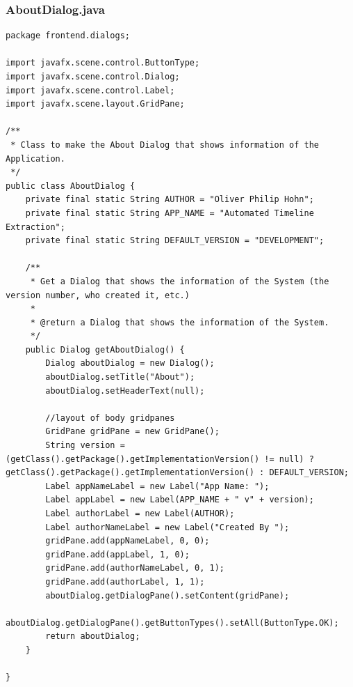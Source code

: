 \subsubsection{AboutDialog.java}
\begin{lstlisting}
package frontend.dialogs;

import javafx.scene.control.ButtonType;
import javafx.scene.control.Dialog;
import javafx.scene.control.Label;
import javafx.scene.layout.GridPane;

/**
 * Class to make the About Dialog that shows information of the Application.
 */
public class AboutDialog {
    private final static String AUTHOR = "Oliver Philip Hohn";
    private final static String APP_NAME = "Automated Timeline Extraction";
    private final static String DEFAULT_VERSION = "DEVELOPMENT";

    /**
     * Get a Dialog that shows the information of the System (the version number, who created it, etc.)
     *
     * @return a Dialog that shows the information of the System.
     */
    public Dialog getAboutDialog() {
        Dialog aboutDialog = new Dialog();
        aboutDialog.setTitle("About");
        aboutDialog.setHeaderText(null);

        //layout of body gridpanes
        GridPane gridPane = new GridPane();
        String version = (getClass().getPackage().getImplementationVersion() != null) ? getClass().getPackage().getImplementationVersion() : DEFAULT_VERSION;
        Label appNameLabel = new Label("App Name: ");
        Label appLabel = new Label(APP_NAME + " v" + version);
        Label authorLabel = new Label(AUTHOR);
        Label authorNameLabel = new Label("Created By ");
        gridPane.add(appNameLabel, 0, 0);
        gridPane.add(appLabel, 1, 0);
        gridPane.add(authorNameLabel, 0, 1);
        gridPane.add(authorLabel, 1, 1);
        aboutDialog.getDialogPane().setContent(gridPane);
        aboutDialog.getDialogPane().getButtonTypes().setAll(ButtonType.OK);
        return aboutDialog;
    }

}
\end{lstlisting}
